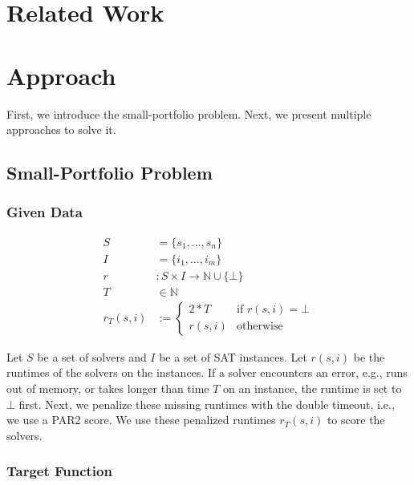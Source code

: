 \documentclass[conference]{IEEEtran}
\begin{document}
\section{Related Work}
\label{sec:related-work}

\section{Approach}
\label{sec:approach}

First, we introduce the small-portfolio problem.
Next, we present multiple approaches to solve it.

\subsection{Small-Portfolio Problem}

\subsubsection{Given Data}
\label{sec:approach:problem:data}

\begin{align*}
	S &= \{s_1, \dots, s_n\} \tag*{Solvers}\\
	I &= \{i_1, \dots, i_m\} \tag*{Instances}\\
	r &: S \times I \rightarrow \mathbb{N} \cup \{\bot\} \tag*{Runtimes (censored)}\\
	T &\in \mathbb{N} \tag*{Timeout}\\
	r_T(s,i) &:= \begin{cases}
		2*T & \text{if }r(s,i) = \bot\\
		r(s,i) & \text{otherwise}
	\end{cases} \tag*{Penalized Runtimes}
\end{align*}

Let $S$ be a set of solvers and $I$ be a set of SAT instances.
Let $r(s,i)$ be the runtimes of the solvers on the instances.
If a solver encounters an error, e.g., runs out of memory, or takes longer than time $T$ on an instance, the runtime is set to $\bot$ first.
Next, we penalize these missing runtimes with the double timeout, i.e., we use a PAR2 score.
We use these penalized runtimes $r_T(s,i)$ to score the solvers.

\subsubsection{Target Function}
\label{sec:approach:problem:target}
\end{document}
